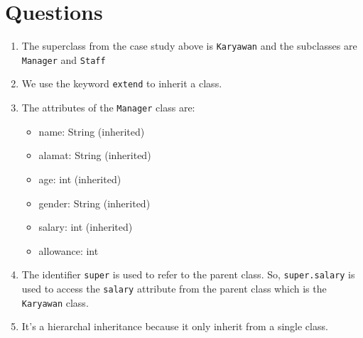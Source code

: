 \documentclass[12pt,titlepage]{article}
\begin{document}
\section{Questions}
\begin{enumerate}
    \item {
        The superclass from the case study above is \texttt{Karyawan} and the subclasses are \texttt{Manager} and \texttt{Staff}
    }
    \item {
        We use the keyword \texttt{extend} to inherit a class.
    }
    \item {
        The attributes of the \texttt{Manager} class are:
        \begin{itemize}
            \item name: String (inherited)
            \item alamat: String (inherited)
            \item age: int (inherited)
            \item gender: String (inherited)
            \item salary: int (inherited)
            \item allowance: int
        \end{itemize}
    }
    \item {
        The identifier \texttt{super} is used to refer to the parent class. So, \texttt{super.salary} is used to access the \texttt{salary} attribute from the parent class
        which is the \texttt{Karyawan} class.
    }
    \item {
        It's a hierarchal inheritance because it only inherit from a single class.
    }
\end{enumerate}
\end{document}
